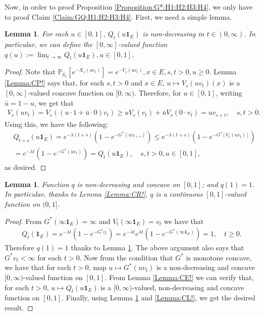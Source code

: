 \documentclass[12pt,a4paper]{amsart}
\numberwithin{equation}{section}
\theoremstyle{plain}
\newtheorem{lem}[thm]{Lemma}
\theoremstyle{definition}
\theoremstyle{remark}
\begin{document}
Now, in order to proof Proposition \ref{Proposition:G*:H1:H2:H3:H4}, we only have to proof Claim \ref{Claim:GQ:H1:H2:H3:H4}.
First, we need a simple lemma.
\begin{lem} \label{Lemma:QM!} 
For each $u \in [0,1]$, $Q_t(u\mathbf 1_E)$ is non-decreasing in $t\in (0,\infty)$. 
In particular, we can define the $[0,\infty]$-valued function $q(u):= \lim_{t\to \infty} Q_t(u\mathbf 1_E), u\in [0,1]$.
\end{lem}
\begin{proof} 
Note that $\mathbb P_{\delta_x}[e^{- X_s(uv_t)}] = e^{-V_s(uv_t)},x\in E, s,t>0, u \geq 0$.
Lemma \ref{Lemma:CP!} says that, for each $s,t > 0$ and $x\in E$, $u\mapsto V_s(uv_t)(x) $ is a $[0,\infty]$-valued concave function on $[0,\infty)$. 
Therefore, for $u\in [0,1]$, writing $\bar u = 1- u$, we get that
\begin{align}
 V_s(uv_t)
   =V_s((u\cdot 1 + \bar u \cdot 0)v_t) 
   \geq uV_s(v_t) + \bar u V_s(0\cdot v_t) 
   = uv_{s+t},
   \quad s,t > 0.
 \end{align} 
Using this, we have the following: 
\begin{align}
  & Q_{t+s}(u\mathbf 1_E) 
 = e^{- \lambda (t+s)} ( 1-e^{-G^*(uv_{t+s})} ) 
 \leq e^{- \lambda(t+s)}( 1-e^{-G^*[V_s(uv_t)]} ) \\
 & = e^{-\lambda t}( 1-e^{-G^*(uv_t)} )
     = Q_t(u\mathbf 1_E),
 \quad s,t > 0, u \in [0,1],
 \end{align}
as desired.
\end{proof}
\begin{lem} \label{Lemma:qC!} 
Function $q$ is non-decreasing and concave on $[0,1]$; and $q(1) = 1$.
In particular, thanks to Lemma \ref{Lemma:CR!}, $q$ is a continuous $[0,1]$-valued function on $(0,1]$.
\end{lem}
\begin{proof} 
From $G^*(\infty \mathbf 1_E) = \infty$ and $V_t(\infty \mathbf 1_E) = v_t$ we have that
\begin{align}
Q_t(\mathbf 1_E) 
= e^{- \lambda t} ( 1-e^{-G^*v_t} ) 
= e^{- \lambda t} e^{\lambda t}( 1-e^{-G^*(\infty\mathbf 1_E)} )
= 1,
\quad t\geq 0.\end{align}
Therefore $q(1) = 1$ thanks to Lemma \ref{Lemma:QM!}.
The above argument also says that $G^*v_t < \infty$ for each $t>0$. 
Now from the condition that $G^*$ is monotone concave, we have that for each $t>0$, map $u \mapsto G^*(uv_t)$ is a non-decreasing and concave $[0,\infty)$-valued function on $[0,1]$.
From Lemma \ref{Lemma:CE!} we can verify that, for each $t> 0$, $u \mapsto Q_t(u \mathbf 1_E)$ is a $[0,\infty)$-valued, non-decreasing and concave function on $[0,1]$.
Finally, using Lemma \ref{Lemma:QM!} and \ref{Lemma:CL!}, we get the desired result. 
\end{proof}
\end{document}

